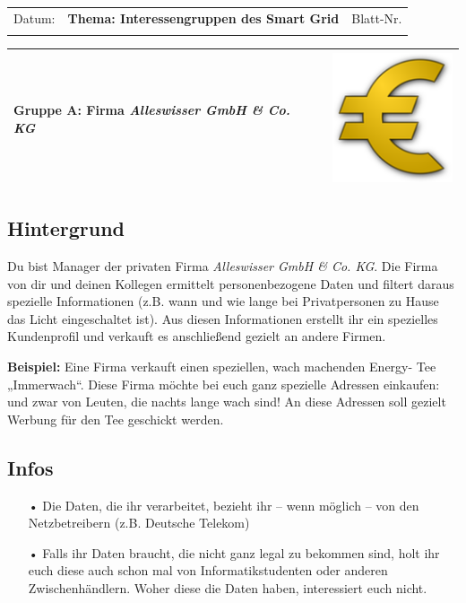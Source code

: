 \documentclass[11pt,a4paper,DIV=10,parskip=half,BCOR=0mm]{scrartcl}
\begin{document}
\setlength{\tabcolsep}{3mm} %
\noindent
\begin{tabularx}{\textwidth}{|l|T|l|}
\hline
Datum: & \rule{0pt}{5mm} \textbf{\textsf{Thema: Interessengruppen des Smart Grid}} & Blatt-Nr. \\
&&\\
\hline
\end{tabularx}

%
\setlength{\tabcolsep}{0mm} %
\begin{tabularx}{\linewidth}{lXr}
{\Large\textsf{\textbf{Gruppe A:} Firma \textit{Alleswisser GmbH \& Co. KG}}} & &
\includegraphics[scale=0.25]{images/euro}\\ %
\hline
\end{tabularx}
%
\subsection*{Hintergrund}
Du bist Manager der privaten Firma \textit{Alleswisser GmbH \& Co. KG}.
Die Firma von dir und deinen Kollegen ermittelt  personenbezogene Daten und filtert daraus spezielle Informationen (z.B. wann und wie lange bei
Privatpersonen zu Hause das Licht eingeschaltet ist). Aus diesen
Informationen erstellt ihr ein spezielles Kundenprofil und verkauft es
anschließend gezielt an andere Firmen.

\textbf{Beispiel: }Eine Firma verkauft einen speziellen, wach machenden Energy-
Tee „Immerwach“. Diese Firma möchte bei euch ganz spezielle Adressen
einkaufen: und zwar von Leuten, die nachts lange wach sind! An diese
Adressen soll gezielt Werbung für den Tee geschickt werden.
\subsection*{Infos}
\begin{enumerate}
	\item[•]Die Daten, die ihr verarbeitet, bezieht ihr -- wenn möglich -- von den Netzbetreibern (z.B.
	Deutsche Telekom)
	\item[•]Falls ihr Daten braucht, die nicht ganz legal zu bekommen sind, holt
	ihr euch diese auch schon mal von Informatikstudenten oder
	anderen Zwischenhändlern. Woher diese die Daten haben,
	interessiert euch nicht.
\end{enumerate}
\end{document}
